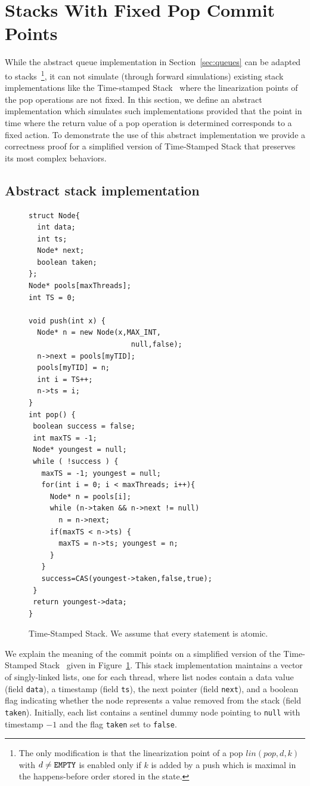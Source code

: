 \section{Stacks With Fixed Pop Commit Points}\label{sec:stacks}

While the abstract queue implementation in Section~\ref{sec:queues} can be adapted to stacks~\footnote{The only modification is that the linearization point of a pop $lin(pop,d,k)$ with $d\neq{\tt EMPTY}$ is enabled only if $k$ is added by a push which is maximal in the happens-before order stored in the state.}, it can not simulate (through forward simulations) existing stack implementations like the Time-stamped Stack~\cite{DBLP:conf/popl/DoddsHK15} where the linearization points of the pop operations are not fixed. In this section, we define an abstract implementation which simulates such implementations provided that the point in time where the return value of a pop operation is determined corresponds to a fixed action. To demonstrate the use of this abstract implementation we provide a correctness proof for a simplified version of Time-Stamped Stack that preserves its most complex behaviors.

\subsection{Abstract stack implementation}


\begin{figure}
\vspace{-14mm}
\begin{lstlisting}
struct Node{
  int data;
  int ts;
  Node* next;
  boolean taken;
};
Node* pools[maxThreads];
int TS = 0;   

void push(int x) {
  Node* n = new Node(x,MAX_INT,
                        null,false);
  n->next = pools[myTID];
  pools[myTID] = n;
  int i = TS++;
  n->ts = i;
}
int pop() {
 boolean success = false;
 int maxTS = -1;
 Node* youngest = null;
 while ( !success ) {
   maxTS = -1; youngest = null;
   for(int i = 0; i < maxThreads; i++){
     Node* n = pools[i];
     while (n->taken && n->next != null)
       n = n->next;
     if(maxTS < n->ts) {
       maxTS = n->ts; youngest = n;
     }
   }
   success=CAS(youngest->taken,false,true);
 }
 return youngest->data;
}
\end{lstlisting}
\vspace{-6mm}
\caption{Time-Stamped Stack. We assume that every statement is atomic.}
\label{fig:TimeStamped}
\vspace{-1mm}
\end{figure}
We explain the meaning of the commit points on a simplified version of the Time-Stamped Stack~\cite{DBLP:conf/popl/DoddsHK15} given in Figure~\ref{fig:TimeStamped}. This stack implementation maintains a vector of singly-linked lists, one for each thread, where list nodes contain a data value (field {\tt data}), a timestamp (field {\tt ts}), the next pointer (field {\tt next}), and a boolean flag indicating whether the node represents a value removed from the stack (field {\tt taken}). Initially, each list contains a sentinel dummy node pointing to {\tt null} with timestamp $-1$ and the flag {\tt taken} set to {\tt false}.

